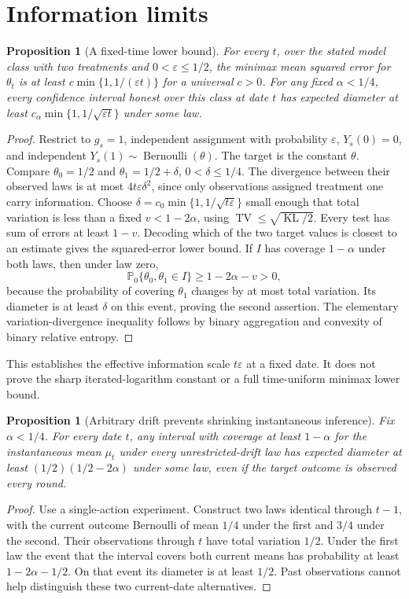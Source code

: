 \documentclass[11pt,a4paper]{article}
\newtheorem{proposition}[theorem]{Proposition}
\theoremstyle{remark}
\newcommand{\Prob}{\mathbb P}
\DeclareMathOperator{\KL}{KL}
\DeclareMathOperator{\TV}{TV}
\begin{document}
\section{Information limits}
\begin{proposition}[A fixed-time lower bound]
For every $t$, over the stated model class with two treatments and $0<\varepsilon\le1/2$, the minimax mean squared error for $\theta_t$ is at least $c\min\{1,1/(\varepsilon t)\}$ for a universal $c>0$. For any fixed $\alpha<1/4$, every confidence interval honest over this class at date $t$ has expected diameter at least $c_\alpha\min\{1,1/\sqrt{\varepsilon t}\}$ under some law.
\end{proposition}
\begin{proof}
Restrict to $g_s=1$, independent assignment with probability $\varepsilon$, $Y_s(0)=0$, and independent $Y_s(1)\sim\operatorname{Bernoulli}(\theta)$. The target is the constant $\theta$. Compare $\theta_0=1/2$ and $\theta_1=1/2+\delta$, $0<\delta\le1/4$. The divergence between their observed laws is at most $4t\varepsilon\delta^2$, since only observations assigned treatment one carry information. Choose $\delta=c_0\min\{1,1/\sqrt{t\varepsilon}\}$ small enough that total variation is less than a fixed $v<1-2\alpha$, using $\TV\le\sqrt{\KL/2}$. Every test has sum of errors at least $1-v$. Decoding which of the two target values is closest to an estimate gives the squared-error lower bound. If $I$ has coverage $1-\alpha$ under both laws, then under law zero,
\[
 \Prob_0\{\theta_0,\theta_1\in I\}\ge1-2\alpha-v>0,
\]
because the probability of covering $\theta_1$ changes by at most total variation. Its diameter is at least $\delta$ on this event, proving the second assertion. The elementary variation-divergence inequality follows by binary aggregation and convexity of binary relative entropy.
\end{proof}
This establishes the effective information scale $t\varepsilon$ at a fixed date. It does not prove the sharp iterated-logarithm constant or a full time-uniform minimax lower bound.

\begin{proposition}[Arbitrary drift prevents shrinking instantaneous inference]
Fix $\alpha<1/4$. For every date $t$, any interval with coverage at least $1-\alpha$ for the instantaneous mean $\mu_t$ under every unrestricted-drift law has expected diameter at least $(1/2)(1/2-2\alpha)$ under some law, even if the target outcome is observed every round.
\end{proposition}
\begin{proof}
Use a single-action experiment. Construct two laws identical through $t-1$, with the current outcome Bernoulli of mean $1/4$ under the first and $3/4$ under the second. Their observations through $t$ have total variation $1/2$. Under the first law the event that the interval covers both current means has probability at least $1-2\alpha-1/2$. On that event its diameter is at least $1/2$. Past observations cannot help distinguish these two current-date alternatives.
\end{proof}
\end{document}

